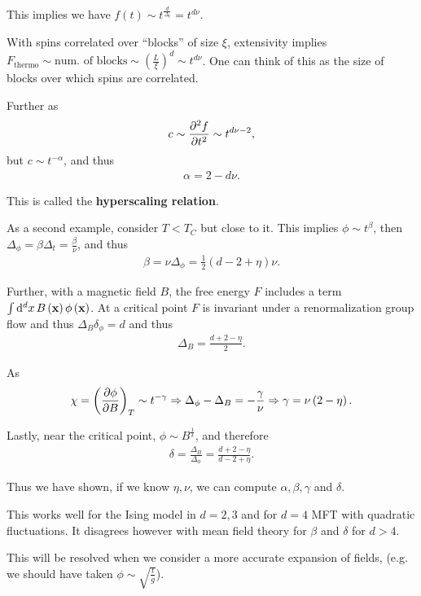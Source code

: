 This implies we have $f\left( t \right) \sim  t^{\frac{d}{\Delta_t}} = t^{d\nu}$.

With spins correlated over ``blocks'' of size $\xi$, extensivity implies $F_\text{thermo} \sim  \text{num. of blocks} \sim \left( \frac{L}{\xi} \right)^{d} \sim  t^{d\nu}$. One can think of this as the size of blocks over which spins are correlated. 

Further as
\begin{align}
    c \sim  \pdv[2]{f}{t} \sim  t^{d \nu - 2}
,\end{align}
but $c \sim  t^{-\alpha}$, and thus
\begin{align}
    \alpha = 2 - d \nu
.\end{align}

This is called the \textbf{hyperscaling relation}.



As a second example, consider $T< T_C$ but close to it. This implies $\phi \sim t^{\beta}$, then $\Delta_\phi = \beta \Delta_t = \frac{\beta}{\nu}$, and thus
\begin{align}
    \beta = \nu \Delta_\phi = \frac{1}{2} \left( d - 2 + \eta \right) \nu
.\end{align}

Further, with a magnetic field $B$, the free energy $F$ includes a term $\int \dd{^{d}x} B\left( \vb{x} \right) \phi \left( \vb{x} \right)$. At a critical point $F$ is invariant under a renormalization group flow and thus $\Delta_B \delta_\phi = d$ and thus
\begin{align}
    \Delta_B = \frac{d + 2 - \eta}{2}
.\end{align}

As
\begin{align}
    \chi = \left( \pdv{\phi}{B} \right)_T \sim  t^{-\gamma} \Rightarrow \Delta_\phi - \Delta_B = - \frac{\gamma}{\nu} \Rightarrow \gamma = \nu \left( 2 - \eta \right) 
.\end{align}

Lastly, near the critical point, $\phi \sim  B^{\frac{1}{\delta}}$, and therefore
\begin{align}
    \delta = \frac{\Delta_B}{\Delta_{\phi}} = \frac{d + 2 - \eta}{d - 2 + \eta}
.\end{align}

Thus we have shown, if we know $\eta, \nu$, we can compute $\alpha, \beta, \gamma$ and $\delta$.

This works well for the Ising model in $d=2,3$ and for $d=4$ MFT with quadratic fluctuations. It disagrees however with mean field theory for $\beta$ and $\delta$ for $d > 4$. 

This will be resolved when we consider a more accurate expansion of fields, (e.g. we should have taken $\phi \sim \sqrt{\frac{t}{g}} $).

